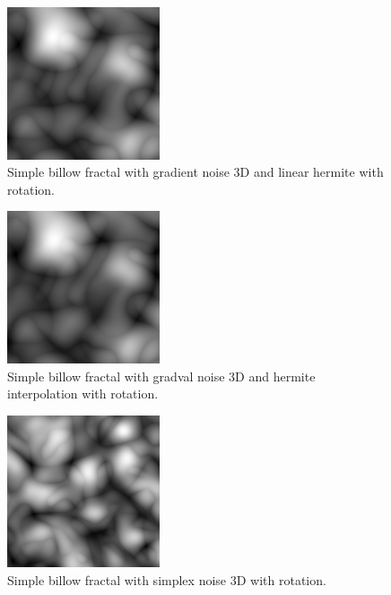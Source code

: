 \begin{figure}[h]
\centering
\includegraphics[width=0.4\textwidth]{out/simpleBillow3/simpleBillow3_gradient_noise3D_hermiteInterp_rot.png}
\caption{Simple billow fractal with gradient noise 3D and linear hermite with rotation.}
\label{fig:simple_billow3_gradient_noise3D_hermiteInterp_rot}
\end{figure}

\begin{figure}[h]
\centering
\includegraphics[width=0.4\textwidth]{out/simpleBillow3/simpleBillow3_gradval_noise3D_hermiteInterp_rot.png}
\caption{Simple billow fractal with gradval noise 3D and hermite interpolation with rotation.}
\label{fig:simple_billow3_gradval_noise3D_hermiteInterp_rot}
\end{figure}

\begin{figure}[h]
\centering
\includegraphics[width=0.4\textwidth]{out/simpleBillow3/simpleBillow3_simplex_noise3D_noInterp_rot.png}
\caption{Simple billow fractal with simplex noise 3D with rotation.}
\label{fig:simple_billow3_simplex_noise3D_noInterp_rot}
\end{figure}

